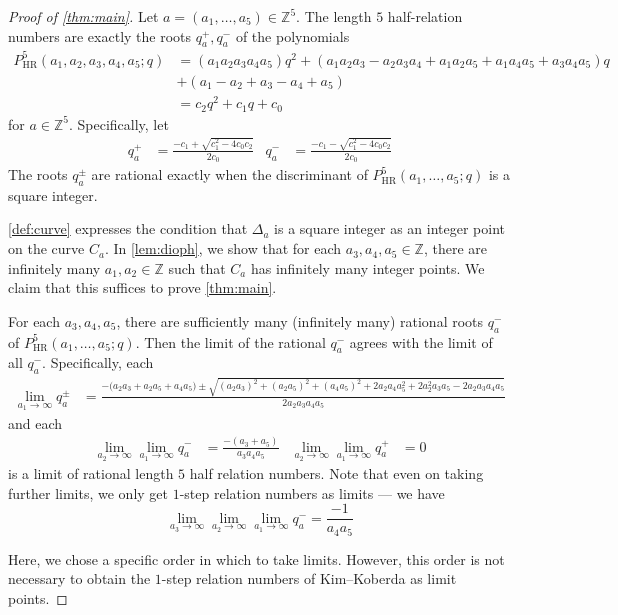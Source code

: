 \documentclass[11 pt]{amsart}
\begin{document}
\begin{proof}[Proof of \cref{thm:main}] 
Let $a = (a_{1}, \dots, a_{5}) \in \mathbb{Z}^{5}$. The length $5$ half-relation numbers are exactly the roots $q_{a}^{+}, q_{a}^{-}$ of the polynomials
\begin{align*}
	P_{\text{HR}}^5(a_1, a_2, a_3, a_4, a_5; q) & =  (a_1a_2a_3a_4a_5)q^2+(a_1a_2a_3-a_2a_3a_4+a_1a_2a_5+a_1a_4a_5+a_3a_4a_5)q\\
     & +(a_1-a_2+a_3-a_4+a_5) \\
     & = c_{2} q^{2} + c_{1} q + c_{0} 
\end{align*}
for $a \in \mathbb{Z}^{5}$. Specifically, let
\begin{align*}
	q_{a}^{+} & = \frac{- c_{1} + \sqrt{c_{1}^{2} - 4 c_{0} c_{2}}}{2 c_{0}} & q_{a}^{-} & = \frac{- c_{1} - \sqrt{c_{1}^{2} - 4 c_{0} c_{2}}}{2 c_{0}}
\end{align*}
The roots $q_{a}^{\pm}$ are rational exactly when the discriminant of $P_{\text{HR}}^{5}(a_{1}, \dots, a_{5}; q)$ is a square integer. 

\cref{def:curve} expresses the condition that $\Delta_{a}$ is a square integer as an integer point on the curve $C_{a}$. In \cref{lem:dioph}, we show that for each $a_{3}, a_{4}, a_{5} \in \mathbb{Z}$, there are infinitely many $a_{1}, a_{2} \in \mathbb{Z}$ such that $C_{a}$ has infinitely many integer points. We claim that this suffices to prove \cref{thm:main}. 

For each $a_{3}, a_{4}, a_{5}$, there are sufficiently many (infinitely many) rational roots $q_{a}^{-}$ of $P_{\text{HR}}^{5}(a_{1}, \dots, a_{5}; q)$. Then the limit of the rational $q_{a}^{-}$ agrees with the limit of all $q_{a}^{-}$. Specifically, each
\begin{align*}
	\lim_{a_1\rightarrow \infty} q_a^{\pm} & = \frac{-\big(a_2a_3+a_2a_5+a_4a_5\big) \pm \sqrt{(a_2a_3)^2+(a_2a_5)^2+(a_4a_5)^2+2a_2a_4a_5^2+2a_2^2a_3a_5-2a_2a_3a_4a_5}}{2a_2a_3a_4a_5}
\end{align*}
and each
\begin{align*}
	\lim_{a_{2} \to \infty} \lim_{a_{1} \to \infty} q_{a}^{-} & = \frac{-(a_{3} + a_{5})}{a_{3} a_{4} a_{5}} & \lim_{a_{2} \to \infty} \lim_{a_{1} \to \infty} q_{a}^{+} & = 0
\end{align*}
is a limit of rational length $5$ half relation numbers. Note that even on taking further limits, we only get $1$-step relation numbers as limits --- we have
\[
	\lim_{a_{3} \to \infty} \lim_{a_{2} \to \infty} \lim_{a_{1} \to \infty} q_{a}^{-} =  \frac{-1}{a_{4} a_{5}}
\]

Here, we chose a specific order in which to take limits. However, this order is not necessary to obtain the $1$-step relation numbers of Kim--Koberda as limit points.
\end{proof}
\end{document}
